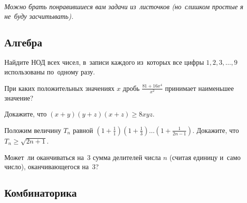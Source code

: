 



\emph{Можно брать понравившиеся вам задачи из~листочков (но~слишком простые я
не~буду засчитывать).}


\subsection*{Алгебра}

\begin{problems}

Найдите НОД всех чисел, в~записи каждого из~которых все цифры
$1, 2, 3, \ldots, 9$ использованы по~одному разу.

\item
При каких положительных значениях $x$ дробь $\frac{81 + 16 x^4}{x^2}$ принимает
наименьшее значение?

\item
Докажите, что $(x + y) (y + z) (x + z) \geq 8 x y z$.

\item
Положим величину $T_{n}$ равной
\(
    \left(1 + \frac{1}{1}\right) \left(1 + \frac{1}{3}\right)
    \ldots
    \left(1 + \frac{1}{2n - 1}\right)
\).
Докажите, что $T_{n} \geq \sqrt{2n + 1}$.

\item
Может~ли оканчиваться на~$3$ сумма делителей числа $n$ (считая единицу и~само
число), оканчивающегося на~$3$?

\end{problems}


\subsection*{Комбинаторика}

